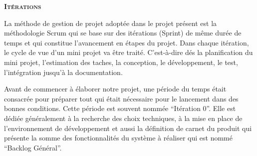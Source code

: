 \thispagestyle{plain}
\begin{center}
\vspace*{7cm}
\textbf{\scshape\Huge Itérations}
\end{center}
{}
\vspace{2cm}

La méthode de gestion de projet adoptée dans le projet présent est la
méthodologie Scrum qui se base sur des itérations (Sprint) de même durée de
temps et qui constitue l'avancement en étapes du projet. Dans chaque itération,
le cycle de vue d'un mini projet va être traité. C'est-à-dire dés la
planification du mini projet, l'estimation des taches, la conception, le
développement, le test, l'intégration jusqu'à la documentation.

Avant de commencer à élaborer notre projet, une période du temps était
consacrée pour préparer tout qui était nécessaire pour le lancement dans des
bonnes conditions. Cette période est souvent nommée ``Itération 0''. Elle est
dédiée généralement à la recherche des choix techniques, à la mise en place de
l'environnement de développement et aussi la définition de carnet du produit
qui présente la somme des fonctionnalités du système à réaliser qui est nommé
``Backlog Général''.
